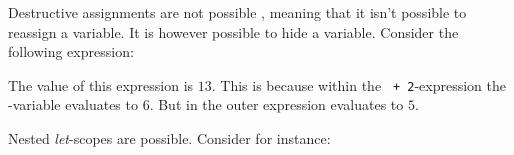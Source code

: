 Destructive assignments are not possible \productname{}, meaning that it isn't possible to 
reassign a variable. It is however possible to hide a variable.
Consider the following expression:


The value of this expression is $13$. This is because within the \texttt{ + 2}-expression
the -variable evaluates to $6$. But in the outer expression  evaluates to
$5$.

Nested \emph{let}-scopes are possible. Consider for instance:




